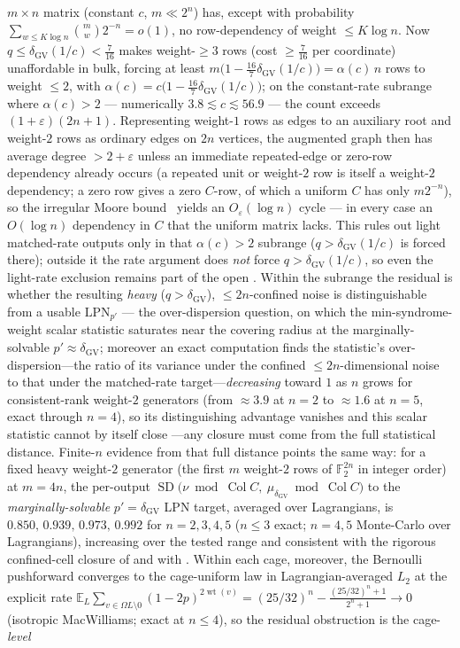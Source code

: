 \documentclass[11pt,a4paper]{article}
\theoremstyle{plain}
\theoremstyle{definition}
\newcommand{\F}{\mathbb{F}}
\begin{document}
$m\times n$ matrix (constant $c$, $m\ll 2^n$) has, except with probability $\sum_{w\le K\log n}\binom{m}{w}2^{-n}=o(1)$, no row-dependency of weight $\le K\log n$. Now $q\le\delta_{\mathrm{GV}}(1/c)<\tfrac7{16}$ makes weight-$\ge3$ rows (cost $\ge\tfrac7{16}$ per coordinate) unaffordable in bulk, forcing at least $m\bigl(1-\tfrac{16}{7}\delta_{\mathrm{GV}}(1/c)\bigr)=\alpha(c)\,n$ rows to weight $\le2$, with $\alpha(c)=c\bigl(1-\tfrac{16}{7}\delta_{\mathrm{GV}}(1/c)\bigr)$; on the constant-rate subrange where $\alpha(c)>2$ --- numerically $3.8\lesssim c\lesssim 56.9$ --- the count exceeds $(1+\varepsilon)(2n{+}1)$. Representing weight-$1$ rows as edges to an auxiliary root and weight-$2$ rows as ordinary edges on $2n$ vertices, the augmented graph then has average degree $>2+\varepsilon$ unless an immediate repeated-edge or zero-row dependency already occurs (a repeated unit or weight-$2$ row is itself a weight-$2$ dependency; a zero row gives a zero $C$-row, of which a uniform $C$ has only $m2^{-n}$), so the irregular Moore bound~\cite{AHL02} yields an $O_\varepsilon(\log n)$ cycle --- in every case an $O(\log n)$ dependency in $C$ that the uniform matrix lacks. This rules out light matched-rate outputs only in that $\alpha(c)>2$ subrange ($q>\delta_{\mathrm{GV}}(1/c)$ is forced there); outside it the rate argument does \emph{not} force $q>\delta_{\mathrm{GV}}(1/c)$, so even the light-rate exclusion remains part of the open . Within the subrange the residual is whether the resulting \emph{heavy} ($q>\delta_{\mathrm{GV}}$), $\le 2n$-confined noise is distinguishable from a usable $\mathrm{LPN}_{p'}$ --- the over-dispersion question, on which the min-syndrome-weight scalar statistic saturates near the covering radius at the marginally-solvable $p'\approx\delta_{\mathrm{GV}}$; moreover an exact computation finds the statistic's over-dispersion---the ratio of its variance under the confined $\le 2n$-dimensional noise to that under the matched-rate target---\emph{decreasing} toward $1$ as $n$ grows for consistent-rank weight-$2$ generators (from $\approx 3.9$ at $n=2$ to $\approx 1.6$ at $n=5$, exact through $n=4$), so its distinguishing advantage vanishes and this scalar statistic cannot by itself close ---any closure must come from the full statistical distance. Finite-$n$ evidence from that full distance points the same way: for a fixed heavy weight-$2$ generator (the first $m$ weight-$2$ rows of $\F_2^{2n}$ in integer order) at $m=4n$, the per-output $\operatorname{SD}\bigl(\nu\bmod\operatorname{Col}C,\ \mu_{\delta_{\mathrm{GV}}}\bmod\operatorname{Col}C\bigr)$ to the \emph{marginally-solvable} $p'=\delta_{\mathrm{GV}}$ LPN target, averaged over Lagrangians, is $0.850,\,0.939,\,0.973,\,0.992$ for $n=2,3,4,5$ ($n\le 3$ exact; $n=4,5$ Monte-Carlo over Lagrangians), increasing over the tested range and consistent with the rigorous confined-cell closure of  and with . Within each cage, moreover, the Bernoulli pushforward converges to the cage-uniform law in Lagrangian-averaged $L_2$ at the explicit rate $\mathbb{E}_L\!\sum_{v\in\Omega L\setminus 0}(1-2p)^{2\operatorname{wt}(v)}=(25/32)^n-\tfrac{(25/32)^n+1}{2^n+1}\to 0$ (isotropic MacWilliams; exact at $n\le4$), so the residual obstruction is the cage-\emph{level} 
\end{document}

